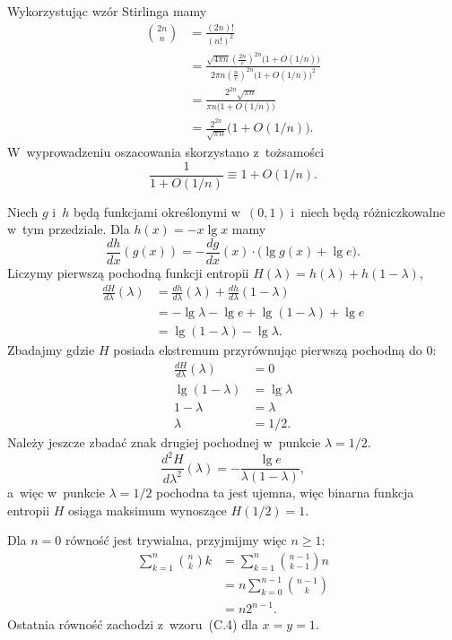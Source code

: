 \exercise{} %
Wykorzystując wzór Stirlinga mamy
\begin{align*}
	\binom{2n}{n} &= \frac{(2n)!}{(n!)^2} \\
	&= \frac{\sqrt{4\pi n}\left(\frac{2n}{e}\right)^{2n}\bigl(1+O(1/n)\bigr)}{2\pi n\left(\frac{n}{e}\right)^{2n}\bigl(1+O(1/n)\bigr)^2} \\[1mm]
	&= \frac{2^{2n}\sqrt{\pi n}}{\pi n\bigl(1+O(1/n)\bigr)} \\[1mm]
	&= \frac{2^{2n}}{\sqrt{\pi n}}\bigl(1+O(1/n)\bigr).
\end{align*}
W~wyprowadzeniu oszacowania skorzystano z~tożsamości
\[
	\frac{1}{1+O(1/n)} \equiv 1+O(1/n)\bigr.
\]

\exercise{} %
Niech $g$ i~$h$ będą funkcjami określonymi w~$(0,1)$ i~niech będą różniczkowalne w~tym przedziale. Dla $h(x)=-x\lg x$ mamy
\[
	\frac{dh}{dx}(g(x)) = -\frac{dg}{dx}(x)\cdot\bigl(\lg g(x)+\lg e\bigr).
\]
Liczymy pierwszą pochodną funkcji entropii $H(\lambda)=h(\lambda)+h(1-\lambda)$,
\begin{align*}
	\frac{dH}{d\lambda}(\lambda) &= \frac{dh}{d\lambda}(\lambda)+\frac{dh}{d\lambda}(1-\lambda) \\
	&= -\lg\lambda-\lg e+\lg(1-\lambda)+\lg e \\
	&= \lg(1-\lambda)-\lg\lambda.
\end{align*}
Zbadajmy gdzie $H$ posiada ekstremum przyrównując pierwszą pochodną do 0:
\begin{align*}
	\frac{dH}{d\lambda}(\lambda) &= 0 \\
	\lg(1-\lambda) &= \lg\lambda \\
	1-\lambda &= \lambda \\
	\lambda &= 1/2.
\end{align*}
Należy jeszcze zbadać znak drugiej pochodnej w~punkcie $\lambda=1/2$.
\[
	\frac{d^2\!H}{d\lambda^2}(\lambda) = -\frac{\lg e}{\lambda(1-\lambda)},
\]
a~więc w~punkcie $\lambda=1/2$ pochodna ta jest ujemna, więc binarna funkcja entropii $H$ osiąga maksimum wynoszące $H(1/2)=1$.

\exercise{} %
Dla $n=0$ równość jest trywialna, przyjmijmy więc $n\ge1$:
\begin{align*}
	\sum_{k=1}^n\binom{n}{k}k &= \sum_{k=1}^n\binom{n-1}{k-1}n \\
	&= n\sum_{k=0}^{n-1}\binom{n-1}{k} \\
	&= n2^{n-1}.
\end{align*}
Ostatnia równość zachodzi z~wzoru~(C.4) dla $x=y=1$.

